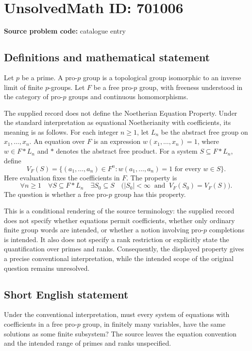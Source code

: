 \documentclass[11pt]{article}
\begin{document}
\section*{UnsolvedMath ID: 701006}
\textbf{Source problem code:} catalogue entry
\subsection{Definitions and mathematical statement}
Let \(p\) be a prime. A pro-\(p\) group is a topological group isomorphic to an inverse limit of finite \(p\)-groups. Let \(F\) be a free pro-\(p\) group, with freeness understood in the category of pro-\(p\) groups and continuous homomorphisms.

The supplied record does not define the Noetherian Equation Property. Under the standard interpretation as equational Noetherianity with coefficients, its meaning is as follows. For each integer \(n\geq 1\), let \(L_n\) be the abstract free group on \(x_1,\ldots,x_n\). An equation over \(F\) is an expression \(w(x_1,\ldots,x_n)=1\), where \(w\in F*L_n\) and \(*\) denotes the abstract free product. For a system \(S\subseteq F*L_n\), define
\[
V_F(S)=\{(a_1,\ldots,a_n)\in F^n: w(a_1,\ldots,a_n)=1\text{ for every }w\in S\}.
\]
Here evaluation fixes the coefficients in \(F\). The property is
\[
\forall n\geq 1\quad\forall S\subseteq F*L_n\quad
\exists S_0\subseteq S\quad
\bigl(|S_0|<\infty\ \text{ and }\ V_F(S_0)=V_F(S)\bigr).
\]
The question is whether a free pro-\(p\) group has this property.

This is a conditional rendering of the source terminology: the supplied record does not specify whether equations permit coefficients, whether only ordinary finite group words are intended, or whether a notion involving pro-\(p\) completions is intended. It also does not specify a rank restriction or explicitly state the quantification over primes and ranks. Consequently, the displayed property gives a precise conventional interpretation, while the intended scope of the original question remains unresolved.
\subsection{Short English statement}
Under the conventional interpretation, must every system of equations with coefficients in a free pro-\(p\) group, in finitely many variables, have the same solutions as some finite subsystem? The source leaves the equation convention and the intended range of primes and ranks unspecified.
\end{document}
